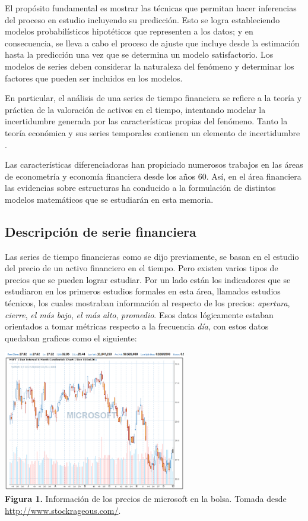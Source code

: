 El propósito fundamental es mostrar las técnicas que permitan hacer inferencias del
proceso en estudio incluyendo su predicción. Esto se logra estableciendo modelos
probabilísticos hipotéticos que representen a los datos; y en consecuencia, se lleva a cabo el
proceso de ajuste que incluye desde la estimación hasta la predicción una vez que se determina
un modelo satisfactorio. Los modelos de series deben considerar la naturaleza del fenómeno y determinar 
los factores que pueden ser incluidos en los modelos.

En particular, el análisis de una series de tiempo financiera se refiere a la teoría y práctica de la valoración 
de activos en el tiempo, intentando modelar la incertidumbre generada por las características propias del fenómeno. Tanto la teoría económica 
y sus series temporales contienen un elemento de incertidumbre \cite{tsay2005analysis}. 

Las características diferenciadoras han propiciado numerosos trabajos en las áreas de econometría y economía financiera desde los años 60.
Así, en el área financiera las evidencias sobre estructuras ha conducido a la formulación de distintos modelos matemáticos que se estudiarán
en esta memoria.

\subsection{Descripción de serie financiera}

Las series de tiempo financieras como se dijo previamente, se basan en el estudio del precio de un activo financiero en el tiempo. Pero existen 
varios tipos de precios que se pueden lograr estudiar. Por un lado están los indicadores que se estudiaron en los primeros estudios formales
en esta área, llamados estudios técnicos, los cuales mostraban información al respecto de los precios: \emph{apertura}, \emph{cierre}, \emph{el más bajo}, 
\emph{el más alto}, \emph{promedio}. Esos datos lógicamente estaban orientados a tomar métricas respecto a la frecuencia \emph{día}, con estos
datos quedaban graficos como el siguiente:

\begin{center}
	\includegraphics[width=0.6\textwidth]{images/microsoft} \\
	\textbf{Figura 1.} Información de los precios de microsoft en la bolsa. Tomada desde \url{http://www.stockrageous.com/}.
\end{center}

